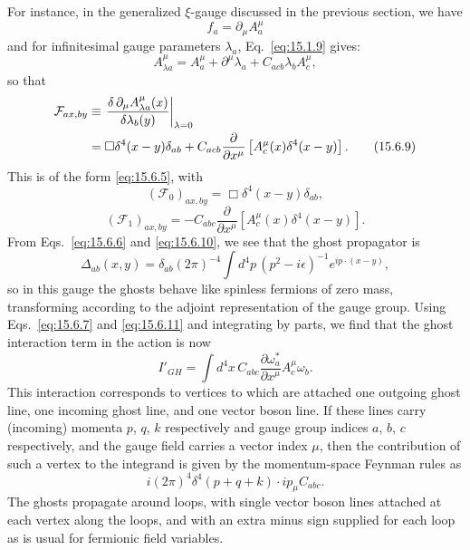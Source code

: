 For instance, in the generalized $\xi$-gauge discussed in the previous
section, we have
\begin{equation}
  f_a=\partial_\mu A_a^\mu
  \tag{15.6.8}\label{eq:15.6.8}
\end{equation}
and for infinitesimal gauge parameters $\lambda_a$, Eq.~\eqref{eq:15.1.9}
gives:
\begin{equation*}
  A_{\lambda a}^\mu
  =A_a^\mu+\partial^\mu\lambda_a
  +C_{acb}\lambda_b A_c^\mu,
\end{equation*}
so that
\begin{align}
  \mathcal F_{a x,b y}
  &\equiv\left.\frac{\delta\,\partial_\mu A_{\lambda a}^\mu(x)}
  {\delta\lambda_b(y)}\right|_{\lambda=0}
  \notag\\
  &=\Box\delta^4(x-y)\delta_{ab}
  +C_{acb}\frac{\partial}{\partial x^\mu}
  \left[A_c^\mu(x)\delta^4(x-y)\right].
  \tag{15.6.9}\label{eq:15.6.9}
\end{align}
This is of the form \eqref{eq:15.6.5}, with
\begin{equation}
  (\mathcal F_0)_{a x,b y}
  =\Box\delta^4(x-y)\delta_{ab},
  \tag{15.6.10}\label{eq:15.6.10}
\end{equation}
\begin{equation}
  (\mathcal F_1)_{a x,b y}
  =-C_{abc}\frac{\partial}{\partial x^\mu}
  \left[A_c^\mu(x)\delta^4(x-y)\right].
  \tag{15.6.11}\label{eq:15.6.11}
\end{equation}
From Eqs.~\eqref{eq:15.6.6} and \eqref{eq:15.6.10}, we see that the ghost
propagator is
\begin{equation}
  \Delta_{ab}(x,y)=\delta_{ab}(2\pi)^{-4}
  \int d^4p\,(p^2-i\epsilon)^{-1}e^{ip\cdot(x-y)},
  \tag{15.6.12}\label{eq:15.6.12}
\end{equation}
so in this gauge the ghosts behave like spinless fermions of zero mass,
transforming according to the adjoint representation of the gauge group.
Using Eqs.~\eqref{eq:15.6.7} and \eqref{eq:15.6.11} and integrating by parts,
we find that the ghost interaction term in the action is now
\begin{equation}
  I'_{GH}=\int d^4x\,C_{abc}
  \frac{\partial\omega_a^*}{\partial x^\mu}
  A_c^\mu\omega_b.
  \tag{15.6.13}\label{eq:15.6.13}
\end{equation}
This interaction corresponds to vertices to which are attached one outgoing
ghost line, one incoming ghost line, and one vector boson line. If these lines
carry (incoming) momenta $p$, $q$, $k$ respectively and gauge group indices
$a$, $b$, $c$ respectively, and the gauge field carries a vector
index $\mu$, then the contribution of such a vertex to the integrand is given
by the momentum-space Feynman rules as
\begin{equation}
  i(2\pi)^4\delta^4(p+q+k)\mathbin{\cdot}ip_\mu C_{abc}.
  \tag{15.6.14}\label{eq:15.6.14}
\end{equation}
The ghosts propagate around loops, with single vector boson lines attached at
each vertex along the loops, and with an extra minus sign supplied for each
loop as is usual for fermionic field variables.


